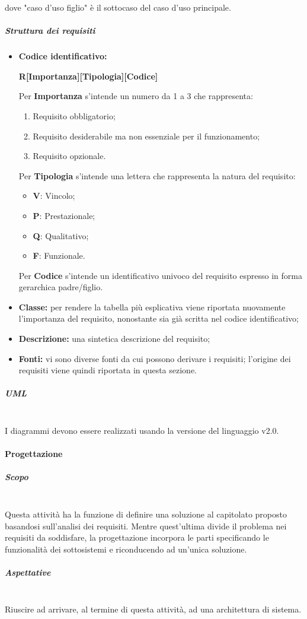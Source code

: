 dove "caso d'uso figlio" è il sottocaso del caso d'uso principale.
\subparagraph{Struttura dei requisiti} \label{para:requisiti}
\begin{itemize}
\item \textbf{Codice identificativo:} 
\begin{center}
\textbf{R[Importanza][Tipologia][Codice]}
\end{center}
 		
Per \textbf{Importanza} s'intende un numero da 1 a 3 che rappresenta:
\begin{enumerate}
\item Requisito obbligatorio;
\item Requisito desiderabile ma non essenziale per il funzionamento;
\item Requisito opzionale.
\end{enumerate}
Per \textbf{Tipologia} s'intende una lettera che rappresenta la natura del requisito:
\begin{itemize}
\item \textbf{V}: Vincolo;
\item \textbf{P}: Prestazionale;
\item \textbf{Q}: Qualitativo;
\item \textbf{F}: Funzionale.
\end{itemize}

Per \textbf{Codice} s'intende un identificativo univoco del requisito espresso in forma gerarchica padre/figlio.
\item \textbf{Classe:} per rendere la tabella più esplicativa viene riportata nuovamente l'importanza del requisito, nonostante sia già scritta nel codice identificativo;
\item \textbf{Descrizione:} una sintetica descrizione del requisito;
\item \textbf{Fonti:} vi sono diverse fonti da cui possono derivare i requisiti; l'origine dei requisiti viene quindi riportata in questa sezione. 
\end{itemize}
\subparagraph{UML} \mbox{} \\
I diagrammi  devono essere realizzati usando la versione del linguaggio v2.0.
\paragraph{Progettazione}
\subparagraph{Scopo} \mbox{} \\
Questa attività ha la funzione di definire una soluzione al capitolato proposto basandosi sull'analisi dei requisiti.
Mentre quest'ultima divide il problema nei requisiti da soddisfare, la progettazione incorpora le parti specificando le funzionalità dei sottosistemi e riconducendo ad un'unica soluzione.
\subparagraph{Aspettative} \mbox{} \\
Riuscire ad arrivare, al termine di questa attività, ad una architettura di sistema.

